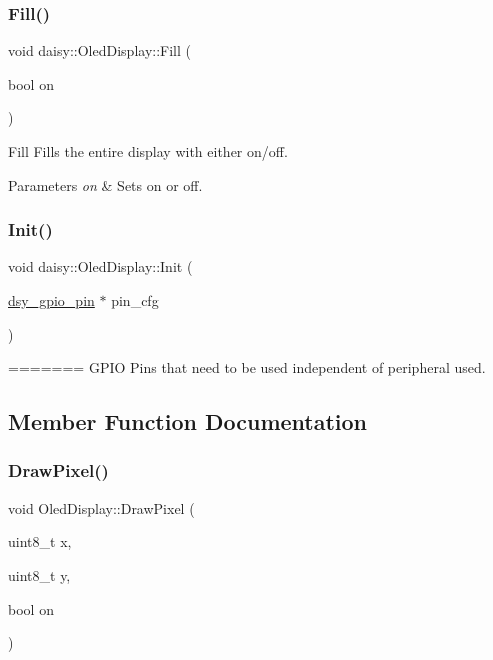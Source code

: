 \subsubsection{\texorpdfstring{Fill()}{Fill()}}
{\footnotesize\ttfamily void daisy\+::\+Oled\+Display\+::\+Fill (\begin{DoxyParamCaption}\item[{bool}]{on }\end{DoxyParamCaption})}

Fill Fills the entire display with either on/off. 
\begin{DoxyParams}{Parameters}
{\em on} & Sets on or off. \\
\hline
\end{DoxyParams}
\mbox{\label{classdaisy_1_1_oled_display_a3db22d3503032fa5f1326009731668e8}} 
\subsubsection{\texorpdfstring{Init()}{Init()}}
{\footnotesize\ttfamily void daisy\+::\+Oled\+Display\+::\+Init (\begin{DoxyParamCaption}\item[{\hyperlink{structdsy__gpio__pin}{dsy\+\_\+gpio\+\_\+pin} $\ast$}]{pin\+\_\+cfg }\end{DoxyParamCaption})}
=======
G\+P\+IO Pins that need to be used independent of peripheral used. 

\subsection{Member Function Documentation}
\mbox{\label{classdaisy_1_1_oled_display_a9a5a03033d6121cb21042ef73037b035}} 
\subsubsection{\texorpdfstring{Draw\+Pixel()}{DrawPixel()}}
{\footnotesize\ttfamily void Oled\+Display\+::\+Draw\+Pixel (\begin{DoxyParamCaption}\item[{uint8\+\_\+t}]{x,  }\item[{uint8\+\_\+t}]{y,  }\item[{bool}]{on }\end{DoxyParamCaption})}

